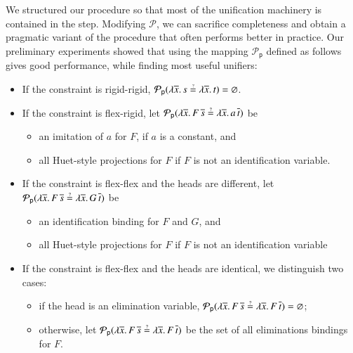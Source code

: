  We structured our procedure so that most of
the unification machinery is contained in the  step. Modifying
$\mathcal{P}$, we can sacrifice completeness and obtain a pragmatic variant of
the procedure that often performs better in practice. 
Our preliminary experiments showed that using the mapping $\mathcal{P}_\mathsf{p}$ defined as follows gives good
performance, while finding most useful unifiers:
\begin{itemize}
    \setlength\itemsep{1\jot}
    \item If the constraint is rigid-rigid, $\mathcal{P}_\mathsf{p}(\lambda \overline{x}.
    \, s \unif \lambda \overline{x}. \, t) = \varnothing$.
    \item If the constraint is flex-rigid,
    let 
    $\mathcal{P}_\mathsf{p}(\lambda \overline{x}. \, F \,\overline{s} \unif \lambda \overline{x}. \, a\, \overline{t})$ 
    be 
    \begin{itemize}
        \item an imitation of $a$ for $F$, if $a$ is a constant, and
        \item all Huet-style projections for $F$ if $F$ is not an identification variable.
    \end{itemize}
    
    \item If the constraint is flex-flex and the heads are different,
    let 
    $\mathcal{P}_\mathsf{p}(\lambda \overline{x}. \, F \,\overline{s} \unif \lambda \overline{x}. \, G\, \overline{t})$ 
    be
    \begin{itemize}
      \item an identification binding for $F$ and $G$, and
      \item all Huet-style projections for $F$ if $F$ is not an identification variable
  \end{itemize}
   
  \item If the constraint is flex-flex and the heads are identical, we distinguish two cases:
      \begin{itemize}
      \item if the head is an elimination variable, 
      $\mathcal{P}_\mathsf{p}(\lambda \overline{x}. \, F \,\overline{s} \unif \lambda \overline{x}. \, F\, \overline{t}) = \varnothing$;
      \item otherwise, let $\mathcal{P}_\mathsf{p}(\lambda \overline{x}. \, F \,\overline{s} \unif \lambda \overline{x}. \, F\, \overline{t})$
            be the set of all eliminations bindings for $F$. 
  \end{itemize}
\end{itemize}

